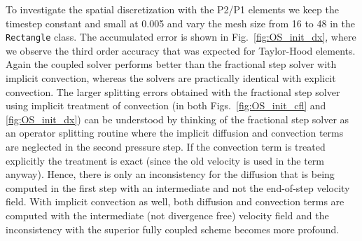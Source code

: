 To investigate the spatial discretization with the P2/P1 elements we keep the timestep constant and small at 0.005 and vary the mesh size from 16 to 48 in the {\fontsize{12pt}{12pt}\texttt{Rectangle}} class. The accumulated error is shown in Fig.~\ref{fig:OS_init_dx}, where we observe the third order accuracy that was expected for Taylor-Hood elements. Again the coupled solver performs better than the fractional step solver with implicit convection, whereas the solvers are practically identical with explicit convection. The larger splitting errors obtained with the fractional step solver using implicit treatment of convection (in both Figs.~\ref{fig:OS_init_cfl} and \ref{fig:OS_init_dx}) can be understood by thinking of the fractional step solver as an operator splitting routine where the implicit diffusion and convection terms are neglected in the second pressure step. If the convection term is treated explicitly the treatment is exact (since the old velocity is used in the term anyway). Hence, there is only an inconsistency for the diffusion that is being computed in the first step with an intermediate and not the end-of-step velocity field. With implicit convection as well, both diffusion and convection terms are computed with the intermediate (not divergence free) velocity field and the inconsistency with the superior fully coupled scheme becomes more profound.

